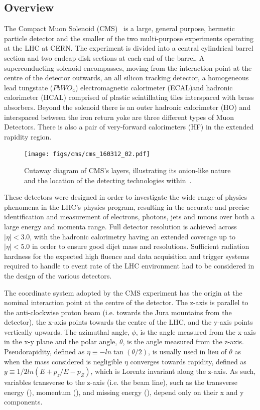 \subsection{Overview}
The Compact Muon Solenoid (CMS)~\cite{oldcms} is a large, general purpose, hermetic particle detector and the smaller of the two multi-purpose experiments operating at the LHC at CERN.
The experiment is divided into a central cylindrical barrel section and two endcap disk sections at each end of the barrel.
A superconducting solenoid encompasses, moving from the interaction point at the centre of the detector outwards, an all silicon tracking detector, a homogeneous lead tungstate ($PbWO_{4}$) electromagnetic calorimeter (ECAL)and hadronic calorimeter (HCAL) comprised of plastic scintillating tiles interspaced with brass absorbers.
Beyond the solenoid there is an outer hadronic calorimeter (HO) and interspaced between the iron return yoke are three different types of Muon Detectors.
There is also a pair of very-forward calorimeters (HF) in the extended rapidity region.

\begin{figure}[htbp]
\begin{center}
\texttt{[image: figs/cms/cms\_160312\_02.pdf]}
\caption{Cutaway diagram of CMS’s layers, illustrating its onion-like nature and the location of the detecting technologies within~\cite{Sakuma:2013jqa}.}
\label{fig:cms-cutaway}
\end{center}
\end{figure}

These detectors were designed in order to investigate the wide range of physics phenomena in the LHC's physics program, resulting in the accurate and precise identification and measurement of electrons, photons, jets and muons over both a large energy and momenta range.
Full detector resolution is achieved across $|\eta| < 3.0$, with the hadronic calorimetry having an extended coverage up to $|\eta| < 5.0$ in order to ensure good dijet mass and \MET resolutions.
Sufficient radiation hardness for the expected high fluence and data acquisition and trigger systems required to handle to event rate of the LHC environment had to be considered in the design of the various detectors.

The coordinate system adopted by the CMS experiment has the origin at the nominal interaction point at the centre of the detector. 
The z-axis is parallel to the anti-clockwise proton beam (i.e. towards the Jura mountains from the detector), the x-axis points towards the centre of the LHC, and the y-axis points vertically upwards.
The azimuthal angle, $\phi$, is the angle measured from the x-axis in the x-y plane and the polar angle, $\theta$, is the angle measured from the z-axis.
Pseudorapidity, defined as $\eta \equiv -ln\tan(\theta/2)$, is usually used in lieu of $\theta$ as when the mass considered is negligible $\eta$ converges towards rapidity, defined as $y \equiv 1/2 ln(E+p_{z}/E-p_{Z})$, which is Lorentz invariant along the z-axis.
As such, variables transverse to the z-axis (i.e. the beam line), such as the transverse energy (\ET), momentum (\pT), and missing energy (\MET), depend only on their x and y components.

